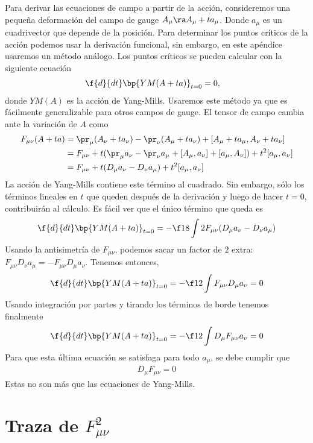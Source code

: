 Para derivar las ecuaciones de campo a partir de la acción, consideremos una pequeña deformación del campo de gauge $A_\mu\ra A_\mu+ta_\mu$. Donde $a_\mu$ es un cuadrivector que depende de la posición. Para determinar los puntos críticos de la acción podemos usar la derivación funcional, sin embargo, en este apéndice usaremos un método análogo. Los puntos críticos se pueden calcular con la siguiente ecuación
\begin{align}
	\f{d}{dt}\bp{YM(A+ta)}_{t=0} &=0,
\end{align}
donde $YM(A)$ es la acción de Yang-Mills. Usaremos este método ya que es fácilmente generalizable para otros campos de gauge. El tensor de campo cambia ante la variación de $A$ como
\begin{align*}
	F_{\mu\nu}(A+ta)&= \pr_\mu(A_\nu+ta_\nu)-\pr_\nu(A_\mu+ta_\nu)+[A_\mu+ta_\mu,A_\nu+ta_\nu]\\
	&= F_{\mu\nu}+t(\pr_\mu a_\nu-\pr_\nu a_\mu+[A_\mu,a_\nu]+[a_\mu,A_\nu])+t^2[a_\mu,a_\nu]\\
	&= F_{\mu\nu}+t(D_\mu a_\nu-D_\nu a_\mu)+t^2[a_\mu,a_\nu]
\end{align*}
La acción de Yang-Mills contiene este término al cuadrado. Sin embargo, sólo los términos lineales en $t$ que queden después de la derivación y luego de hacer $t=0$, contribuirán al cálculo. Es fácil ver que el único término que queda es
\begin{align}
	\f{d}{dt}\bp{YM(A+ta)}_{t=0} = -\f 18\int 2F_{\mu\nu}(D_\mu a_\nu-D_\nu a_\mu)
\end{align}
Usando la antisimetría de $F_{\mu\nu}$, podemos sacar un factor de $2$ extra: $F_{\mu\nu}D_\nu a_\mu=-F_{\mu\nu}D_\mu a_\nu$. Tenemos entonces,
\begin{align}
	\f{d}{dt}\bp{YM(A+ta)}_{t=0} = -\f 12\int F_{\mu\nu}D_\mu a_\nu =0
\end{align}
Usando integración por partes y tirando los términos de borde tenemos finalmente
\begin{align}
	\f{d}{dt}\bp{YM(A+ta)}_{t=0} = -\f 12\int D_\mu F_{\mu\nu}a_\nu =0
\end{align}
Para que esta última ecuación se satisfaga para todo $a_\mu$, se debe cumplir que
\begin{align}
	D_\mu F_{\mu\nu} =0
\end{align}
Estas no son más que las ecuaciones de Yang-Mills.

\section{Traza de $F_{\mu\nu}^2$}\label{app:a2}

